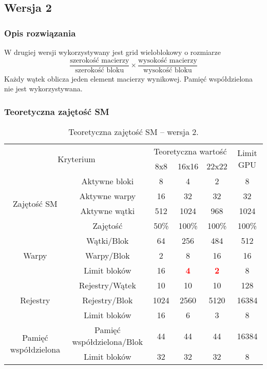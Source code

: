\newpage
\subsection{Wersja 2}

\subsubsection{Opis rozwiązania}

W drugiej wersji wykorzystywany jest grid wieloblokowy o rozmiarze\footnotemark $$\frac{\text{szerokość macierzy}}{\text{szerokość bloku}} \times \frac{\text{wysokość macierzy}}{\text{wysokość bloku}}$$
Każdy wątek oblicza jeden element macierzy wynikowej. Pamięć współdzielona nie jest wykorzystywana.



\newpage
\subsubsection{Teoretyczna zajętość SM}

\begin{center}
\begin{table}[H]
\centering
\begin{tabular}{|c|c|c|c|c|c|}
\hline
\multicolumn{2}{|c|}{\multirow{2}{*}{Kryterium}} & \multicolumn{3}{c|}{Teoretyczna wartość} & \multirow{2}{*}{Limit GPU} \\ \cline{3-5}
\multicolumn{2}{|c|}{} & 8x8 & 16x16 & 22x22 & \\ \hline
\multirow{4}{*}{Zajętość SM} & Aktywne bloki & 8 & 4 & 2 & 8 \\ \cline{2-6}
& Aktywne warpy & 16 & 32 & 32 & 32 \\ \cline{2-6}
& Aktywne wątki & 512 & 1024 & 968 & 1024 \\ \cline{2-6}
& Zajętość & 50\% & 100\% & 100\% & 100\% \\ \hline
\multirow{3}{*}{Warpy} & Wątki/Blok & 64 & 256 & 484 & 512 \\ \cline{2-6}
& Warpy/Blok & 2 & 8 & 16 & 16 \\ \cline{2-6}
& Limit bloków & 16 & \textcolor{red}{\textbf{4}} & \textcolor{red}{\textbf{2}} & 8 \\ \hline
\multirow{3}{*}{Rejestry} & Rejestry/Wątek & 10 & 10 & 10 & 128 \\ \cline{2-6}
& Rejestry/Blok & 1024 & 2560 & 5120 & 16384 \\ \cline{2-6}
& Limit bloków & 16 & 6 & 3 & 8 \\ \hline
\multirow{2}{*}{Pamięć współdzielona} & Pamięć współdzielona/Blok & 44 & 44 & 44 & 16384 \\ \cline{2-6}
& Limit bloków & 32 & 32 & 32 & 8 \\ \hline
\end{tabular}
\caption{Teoretyczna zajętość SM -- wersja 2.}
\end{table}
\end{center}

